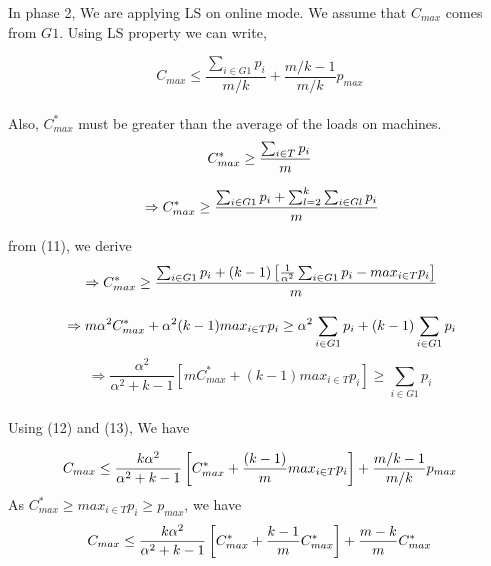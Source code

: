 \documentclass[10pt, conference, compsocconf]{IEEEtran}
\begin{document}
In phase 2, We are applying LS on online mode. We assume that $C_{max}$ comes from $G1$. Using LS property we can write,

\begin{equation}
 C_{max} \leq \frac{\sum_{i \in G1 }^{}{{p_{i}}}}{m/k} + {\frac{m/k-1}{m/k}} p_{max} 
\end{equation}
\\

Also, $C_{max}^{*}$ must be greater than the average of the  loads on  machines.\\

\begin{equation}{\nonumber}
C_{max}^{*} \geq  \frac{\sum_{i \in T }^{}{{p_{i}}}}{m}
\end{equation}

\begin{equation}
{\nonumber}\Rightarrow C_{max}^{*} \geq  \frac{\sum_{i \in G1 }^{}{{p_{i}}}+ \sum_{l=2}^{k}\sum_{i \in Gl }^{}{{p_{i}}}}{m}
\end{equation}




from (11), we derive\\

\begin{equation}{\nonumber}
\Rightarrow C_{max}^{*} \geq  \frac{\sum_{i \in G1 }^{}{{p_{i}}}+ (k-1)\left[\frac{1}{\alpha^{2}}\sum_{i \in G1 }^{}{{p_{i}}}-  {max_{i \in T}}{{p_{i}}}\right]}{m}
\end{equation}

\begin{equation}{\nonumber}
\Rightarrow m\alpha^{2}C_{max}^{*} + \alpha^{2} (k-1){max_{i \in T}}{{p_{i}}} \geq  \alpha^{2}\sum_{i \in G1 }^{}{{p_{i}}}+ (k-1)\sum_{i \in G1 }^{}{{p_{i}}} 
\end{equation}
\begin{equation}
\Rightarrow\frac{\alpha^{2}}{\alpha^{2}+k-1}\left[m C_{max}^{*}+(k-1) {max_{i \in T}}{{p_{i}}}\right] \geq \sum_{i \in G1 }^{}{{p_{i}}}  
\end{equation}
\\
Using (12) and (13), We have

\begin{equation}{\nonumber}
C_{max} \leq \frac{k\alpha^{2}}{\alpha^{2}+k-1}\left[ C_{max}^{*}+\frac{(k-1)}{m} {max_{i \in T}}{{p_{i}}}\right] + {\frac{m/k-1}{m/k}} p_{max} 
\end{equation}
 As $C_{max}^{*}\geq {{max_{i \in T}}{p_{i}}}\geq p_{max}$, we have\\
\begin{equation}{\nonumber}
 C_{max} \leq \frac{k\alpha^{2}}{\alpha^{2}+k-1}\left[ C_{max}^{*}+ {\frac{k-1}{m}}{C_{max}^{*}}\right] + {\frac{m-k}{m}} C_{max}^{*} \end{equation} \\
 
\end{document}
